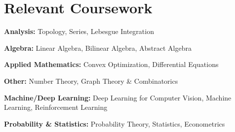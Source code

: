 \documentclass[letterpaper,11pt]{article}
\newcommand{\resumeSubHeadingListStart}{\begin{itemize}[leftmargin=0.15in, label={}]}
\newcommand{\resumeSubHeadingListEnd}{\end{itemize}}
\begin{document}

\section{Relevant Coursework}
  \vspace{2pt}
  \resumeSubHeadingListStart
    \small{\item{
        \textbf{Analysis:}{ Topology, Series, Lebesgue Integration} \\ \vspace{3pt}

        \textbf{Algebra:}{ Linear Algebra, Bilinear Algebra, Abstract Algebra} \\ \vspace{3pt}
        
        \textbf{Applied Mathematics:}{ Convex Optimization, Differential Equations} \\ \vspace{3pt}
                
        \textbf{Other:}{ Number Theory, Graph Theory \& Combinatorics } \\ \vspace{3pt}

        \textbf{Machine/Deep Learning:}{ Deep Learning for Computer Vision, Machine Learning, Reinforcement Learning} \\ \vspace{3pt}
        
        \textbf{Probability \& Statistics:}{ Probability Theory, Statistics, Econometrics} 
    }}
  \resumeSubHeadingListEnd










    



\end{document}
